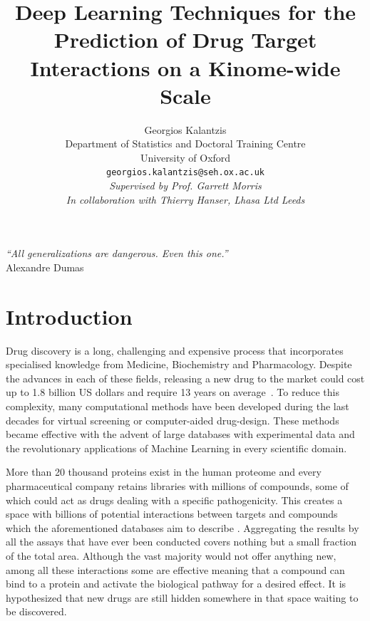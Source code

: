 \documentclass[10pt]{article}
\title{Deep Learning Techniques for the Prediction of Drug Target Interactions on a Kinome-wide Scale}
\author{
	\Large{Georgios Kalantzis}   \vspace{3mm} \\
	Department of Statistics and Doctoral Training Centre\\
	University of Oxford\\
	\texttt{georgios.kalantzis@seh.ox.ac.uk} \vspace{8mm}\\
	\textit{Supervised by Prof. Garrett Morris}\\
	\textit{In collaboration with Thierry Hanser, Lhasa Ltd Leeds}\\
}
\begin{document}
\maketitle
\clearpage
\begin{center}
	\thispagestyle{empty}
	\vspace*{\fill}
	\begin{flushright}
		\textit{``All generalizations are dangerous. Even this one.''}\\
	 	Alexandre Dumas
	\end{flushright}
	\vspace*{\fill}
\end{center}
\newpage
\begin{abstract}
    \lipsum[1-2]
\end{abstract}

\vspace{1cm}

\clearpage
\section{Introduction}
Drug discovery is a long, challenging and expensive process that incorporates specialised knowledge from Medicine, Biochemistry and Pharmacology. Despite the advances in each of these fields, releasing a new drug to the market could cost up to 1.8 billion US dollars and require 13 years on average~\cite{rifaioglu2018recent}. To reduce this complexity, many computational methods have been developed during the last decades for virtual screening or computer-aided drug-design. These methods became effective with the advent of large databases with experimental data and the revolutionary applications of Machine Learning in every scientific domain. 

More than 20 thousand proteins exist in the human proteome and every pharmaceutical company retains libraries with millions of compounds, some of which could act as drugs dealing with a specific pathogenicity. This creates a space with billions of potential interactions between targets and compounds which the aforementioned databases aim to describe \cite{rifaioglu2018recent,gaulton2011chembl,bento2014chembl}. Aggregating the results by all the assays that have ever been conducted covers nothing but a small fraction of the total area.  Although the vast majority would not offer anything new, among all these interactions some are effective meaning that a compound can bind to a protein and activate the biological pathway for a desired effect. It is hypothesized that new drugs are still hidden somewhere in that space waiting to be discovered.
\end{document}
